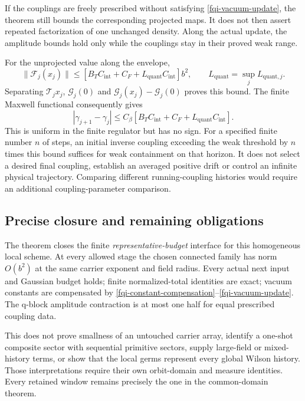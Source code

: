 \documentclass[11pt]{article}
\theoremstyle{remark}
\begin{document}
If the couplings are freely prescribed without satisfying
\eqref{fqi-vacuum-update}, the theorem still bounds the
corresponding projected maps. It does not then assert
repeated factorization of one unchanged density. Along
the actual update, the amplitude bounds hold only while
the couplings stay in their proved weak range.

For the unprojected value along the envelope,
\begin{equation}
 \|\mathcal F_j(x_j)\|
 \le[B_TC_{\mathrm{int}}+C_F+L_{\mathrm{quant}}C_{\mathrm{int}}]b^2,
 \qquad L_{\mathrm{quant}}=\sup_j L_{\mathrm{quant},j}.
 \label{fqi-unprojected-bound}
\end{equation}
Separating $\mathcal T_jx_j$, $\mathcal G_j(0)$ and
$\mathcal G_j(x_j)-\mathcal G_j(0)$ proves this bound.
The finite Maxwell functional consequently gives
\begin{equation}
 |\gamma_{j+1}-\gamma_j|
 \le C_\beta[B_TC_{\mathrm{int}}+C_F
                              +L_{\mathrm{quant}}C_{\mathrm{int}}].
 \label{fqi-increment-bound}
\end{equation}
This is uniform in the finite regulator but has no sign.
For a specified finite number $n$ of steps, an initial
inverse coupling exceeding the weak threshold by $n$ times
this bound suffices for weak containment on that horizon.
It does not select a desired final coupling, establish an
averaged positive drift or control an infinite physical
trajectory. Comparing different running-coupling histories
would require an additional coupling-parameter comparison.

\subsection{Precise closure and remaining obligations}
\label{fqi-scope-section}

The theorem closes the finite \emph{representative-budget}
interface for this homogeneous local scheme. At every allowed
stage the chosen connected family has norm $O(b^2)$ at the
same carrier exponent and field radius. Every actual next
input and Gaussian budget holds; finite normalized-total
identities are exact; vacuum constants are compensated by
\eqref{fqi-constant-compensation}--\eqref{fqi-vacuum-update}.
The q-block amplitude contraction is at most one half for
equal prescribed coupling data.

This does not prove smallness of an untouched carrier array,
identify a one-shot composite sector with sequential primitive
sectors, supply large-field or mixed-history terms, or show
that the local germs represent every global Wilson history.
Those interpretations require their own orbit-domain and
measure identities. Every retained window remains precisely
the one in the common-domain theorem.
\end{document}
